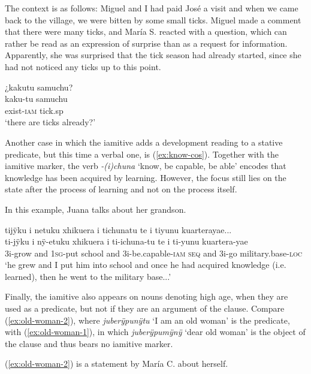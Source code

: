 The context is as follows: Miguel and I had paid José a visit and when we came back to the village, we were bitten by some small ticks. Miguel made a comment that there were many ticks, and María S. reacted with a question, which can rather be read as an expression of surprise than as a request for information. Apparently, she was surprised that the tick season had already started, since she had not noticed any ticks up to this point.

\ea\label{ex:ticks}
\begingl 
\glpreamble ¿kakutu samuchu?\\
\gla kaku-tu samuchu\\ 
\glb exist-\textsc{iam} tick.sp\\ 
\glft ‘there are ticks already?’\\ 
\endgl
\trailingcitation{[mrx-c120509l.149]}
\xe

Another case in which the iamitive adds a development reading to a stative predicate, but this time a verbal one, is (\ref{ex:know-cos}). Together with the iamitive marker, the verb \textit{-(i)chuna} ‘know, be capable, be able’ encodes that knowledge has been acquired by learning. However, the focus still lies on the state after the process of learning and not on the process itself.

In this example, Juana talks about her grandson.

\ea\label{ex:know-cos}
\begingl 
\glpreamble tijÿku i netuku xhikuera i tichunatu te i tiyunu kuarterayae...\\
\gla ti-jÿku i nÿ-etuku xhikuera i ti-ichuna-tu te i ti-yunu kuartera-yae\\ 
\glb 3i-grow and 1\textsc{sg}-put school and 3i-be.capable-\textsc{iam} \textsc{seq} and 3i-go military.base-\textsc{loc}\\ 
\glft ‘he grew and I put him into school and once he had acquired knowledge (i.e. learned), then he went to the military base...’\\ 
\endgl
\trailingcitation{[jxx-p110923l-1.173-176]}
\xe

Finally, the iamitive also appears on nouns denoting high age, when they are used as a predicate, but not if they are an argument of the clause. Compare (\ref{ex:old-woman-2}), where \textit{juberÿpu\-nÿtu} ‘I am an old woman’ is the predicate, with (\ref{ex:old-woman-1}), in which \textit{juberÿpu\-mÿnÿ} ‘dear old woman’ is the object of the clause and thus bears no iamitive marker.


(\ref{ex:old-woman-2}) is a statement by María C. about herself.


